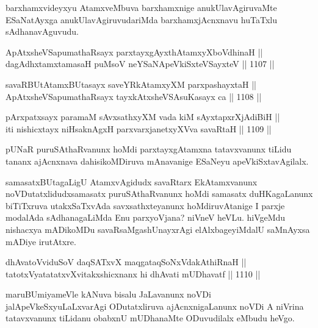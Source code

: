 
\begin{artha}
barxhamxvideyxyu AtamxveMbuva barxhamxnige anukUlavAgiruvaMte ESaNatAyxga anukUlavAgiruvudariMda barxhamxjAcnxnavu huTaTxlu sAdhanavAguvudu.
\end{artha}

\begin{shl}
ApAtxsheVSapumathaRsayx parxtayxgAyxthAtamxyXboVdhinaH || \\
dagAdhxtamxtamasaH puMsoV neYSaNA\s peVkiSxteVSayxteV \hfill || 1107 ||  
\end{shl}
				
\begin{shl}
savaRBUtAtamxBUtasayx saveYRkAtamxyXM parxpashayxtaH || \\
ApAtxsheVSapumathaRsayx tayxkAtxsheVSAsuKasayx ca \hfill || 1108 ||  
\end{shl}
				
\begin{shl}
pArxpatxsayx paramaM sAvxsathxyXM vada kiM sAyxtapxrXjAdiBiH || \\
iti nishicxtayx niHsaknAgxH parxvarxjanetxyXVva savaRtaH \hfill || 1109 ||  
\end{shl}

\begin{artha}
pUNaR puruSAthaRvanunx hoMdi parxtayxgAtamxna tatavxvanunx tiLidu tananx ajAcnxnava dahisikoMDiruva mAnavanige ESaNeyu apeVkiSxtavAgilalx.
\end{artha}

\begin{artha}
samasatxBUtagaLigU AtamxvAgidudx savaRtarx EkAtamxvanunx noVDutatxlidudxsamasatx puruSAthaRvanunx hoMdi samasatx duHKagaLanunx biTiTxruva utakxSaTxvAda savxsathxteyanunx hoMdiruvAtanige I parxje modalAda sAdhanagaLiMda Enu parxyoVjana? niVneV heVLu. hiVgeMdu nishacxya mADikoMDu savaRsaMgashUnayxrAgi elAlxbageyiMdalU saMnAyxsa mADiye irutAtxre.
\end{artha}


\begin{shl}
dhAvatoV\s viduSoV daqSATxvX maqgataqSoNxVdakAthiRnaH || \\
tatotxVyatatatxvXvitakxshicxnanx hi dhAvati mUDhavatf \hfill || 1110 ||  
\end{shl}

\begin{artha}
maruBUmiyameVle kANuva bisalu JaLavanunx noVDi jalApeVkeSxyuLaLxvarAgi ODutatxliruva ajAcnxnigaLanunx noVDi A niVrina tatavxvanunx tiLidanu obabxnU mUDhanaMte ODuvudilalx eMbudu heVgo.
\end{artha}

